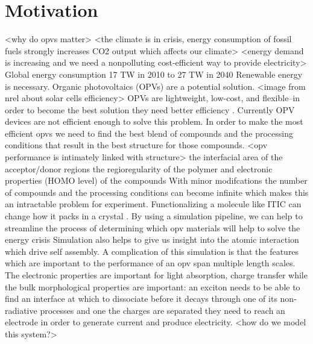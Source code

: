 \newcommand{\ej}[1]{\textcolor{red}{\textit{#1} -- EJ.}}
\newcommand{\cj}[1]{\textcolor{orange}{\textit{#1} -- CJ.}}
\section*{Motivation}
<why do opvs matter>
<the climate is in crisis, energy consumption of fossil fuels strongly increases CO2 output which affects our climate>\cite{Solomon2009a}
<energy demand is increasing and we need a nonpolluting cost-efficient way to provide electricity>
Global energy consumption 17 TW in 2010 to 27 TW in 2040 \cite{Mazzio2015}
Renewable energy is necessary.
Organic photovoltaics (OPVs) are a potential solution.
<image from nrel about solar cells efficiency>\cite{https://www.nrel.gov/pv/cell-efficiency.html}
OPVs are lightweight, low-cost, and flexible--in order to become the best solution they need better efficiency \cite{Mazzioi2015}.
Currently OPV devices are not efficient enough to solve this problem.
In order to make the most efficient opvs we need to find the best blend of compounds and the processing conditions that result in the best structure for those compounds.
<opv performance is intimately linked with structure>
the interfacial area of the acceptor/donor regions \cite{Mazzio2015} the regioregularity of the polymer \cite{Kim2006} and electronic properties (HOMO level) of the compounds \cite{Scharber2006a}
With minor modifcations the number of compounds and the processing conditions can become infinite which makes this an intractable problem for experiment.
Functionalizing a molecule like ITIC can change how it packs in a crystal \cite{Swick2019a}.
By using a simulation pipeline, we can help to streamline the process of determining which opv materials will help to solve the energy crisis
Simulation also helps to give us insight into the atomic interaction which drive self assembly.
A complication of this simulation is that the features which are important to the performance of an opv span multiple length scales.
The electronic properties are important for light absorption, charge transfer \cite{Scharber2006,Hoppe2004,Mazzio2015}
while the bulk morphological properties are important: an exciton needs to be able to find an interface at which to dissociate before it decays through one of its non-radiative processes and one the charges are separated they need to reach an electrode in order to generate current and produce electricity.
<how do we model this system?>

